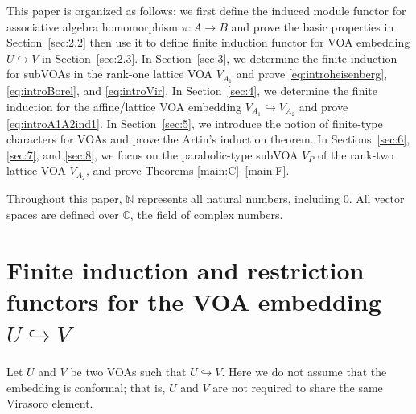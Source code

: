\documentclass[12pt,a4paper,reqno]{amsart}
\numberwithin{equation}{section}
\numberwithin{equation}{section}
\theoremstyle{definition}
\newcommand{\N}{\mathbb{N}}
\def \ra {\rightarrow}
\def \C {\mathbb{C}}
\def\hr{\hookrightarrow}
\begin{document}
This paper is organized as follows: we first define the induced module functor for associative algebra homomorphism $\pi:A\ra B$ and prove the basic properties in Section~\ref{sec:2.2} then use it to define finite induction functor for VOA embedding $U\hr V$ in Section~\ref{sec:2.3}. In Section~\ref{sec:3}, we determine the finite induction for subVOAs in the rank-one lattice VOA $V_{A_1}$ and prove \eqref{eq:introheisenberg}, \eqref{eq:introBorel}, and \eqref{eq:introVir}. In Section~\ref{sec:4}, we determine the finite induction for the affine/lattice VOA embedding $V_{A_1}\hr V_{A_2}$ and prove \eqref{eq:introA1A2ind1}. In Section~\ref{sec:5}, we introduce the notion of finite-type characters for VOAs and prove the Artin's induction theorem. In Sections~\ref{sec:6}, \ref{sec:7}, and \ref{sec:8}, we focus on the parabolic-type subVOA $V_P$ of the rank-two lattice VOA $V_{A_2}$, and prove Theorems \ref{main:C}--\ref{main:F}. 

Throughout this paper, $\N$ represents all natural numbers, including $0$. All vector spaces are defined over $\C$, the field of complex numbers. 













\section{Finite induction and restriction functors for the VOA embedding $U\hr V$}

Let $U$ and $V$ be two VOAs such that $U \hookrightarrow V$. Here we do not assume that the embedding is conformal; that is, $U$ and $V$ are not required to share the same Virasoro element. 
\end{document}
